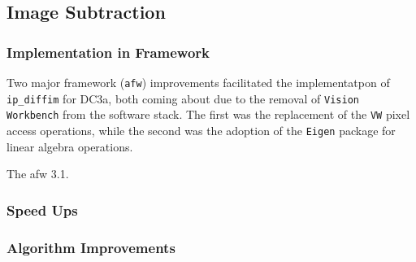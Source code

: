 
\subsection{Image Subtraction}

\subsubsection{Implementation in Framework}

Two major framework ({\tt afw}) improvements facilitated the
implementatpon of {\tt ip_diffim} for DC3a, both coming about due to
the removal of {\tt Vision Workbench} from the software stack.  The
first was the replacement of the {\tt VW} pixel access operations,
while the second was the adoption of the {\tt Eigen} package for
linear algebra operations.  

The afw 3.1.

\subsubsection{Speed Ups}

\subsubsection{Algorithm Improvements}
